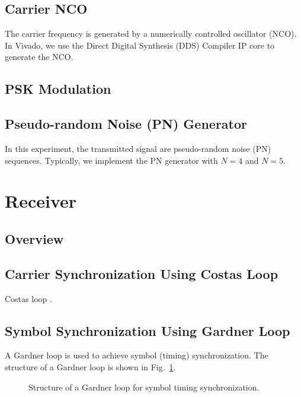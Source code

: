 \documentclass[journal,twoside]{IEEEtran}
\begin{document}
    \subsection{Carrier NCO}

      The carrier frequency is generated by a numerically controlled oscillator (NCO).
      In Vivado, we use the Direct Digital Synthesis (DDS) Compiler IP core to generate the NCO.

  \subsection{PSK Modulation}

    \subsection{Pseudo-random Noise (PN) Generator}

      In this experiment, the transmitted signal are pseudo-random noise (PN) sequences.
      Typically, we implement the PN generator with $N=4$ and $N=5$. %

  \IEEEpubidadjcol
  \section{Receiver}

    \subsection{Overview}

    \subsection{Carrier Synchronization Using Costas Loop}

      Costas loop \cite{simon1977optimum}.

    \subsection{Symbol Synchronization Using Gardner Loop}

      A Gardner loop \cite{gardner1986bpsk} is used to achieve symbol (timing) synchronization.
      The structure of a Gardner loop is shown in Fig.~\ref{fig:gardner_loop}.
      \begin{figure}[htbp]
        \caption{Structure of a Gardner loop for symbol timing synchronization.}
        \label{fig:gardner_loop}
      \end{figure}
\end{document}
